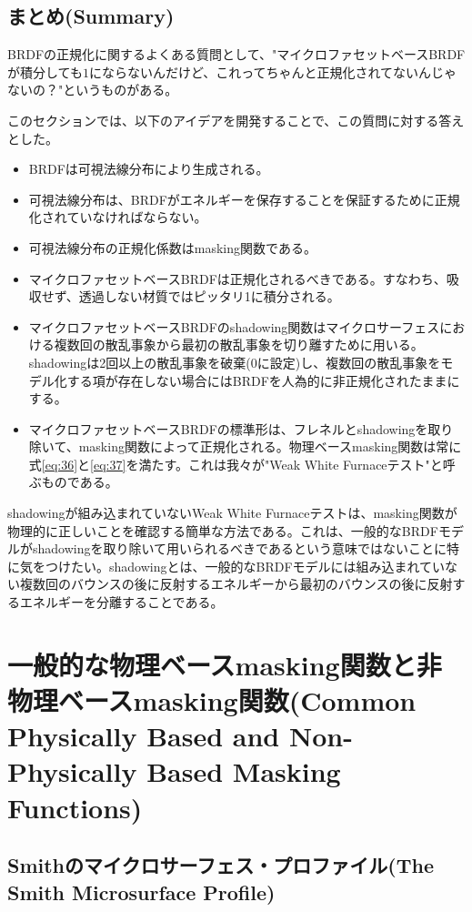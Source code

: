 \documentclass[a4j,xelatex,ja=standard]{bxjsarticle}
\begin{document}
\subsection{まとめ(Summary)}

BRDFの正規化に関するよくある質問として、"マイクロファセットベースBRDFが積分しても$1$にならないんだけど、これってちゃんと正規化されてないんじゃないの？"というものがある。

このセクションでは、以下のアイデアを開発することで、この質問に対する答えとした。

\begin{itemize}
\item BRDFは可視法線分布により生成される。
\item 可視法線分布は、BRDFがエネルギーを保存することを保証するために正規化されていなければならない。
\item 可視法線分布の正規化係数はmasking関数である。
\item マイクロファセットベースBRDFは正規化されるべきである。すなわち、吸収せず、透過しない材質ではピッタリ1に積分される。
\item マイクロファセットベースBRDFのshadowing関数はマイクロサーフェスにおける複数回の散乱事象から最初の散乱事象を切り離すために用いる。shadowingは2回以上の散乱事象を破棄(0に設定)し、複数回の散乱事象をモデル化する項が存在しない場合にはBRDFを人為的に非正規化されたままにする。
\item マイクロファセットベースBRDFの標準形は、フレネルとshadowingを取り除いて、masking関数によって正規化される。物理ベースmasking関数は常に式\eqref{eq:36}と\eqref{eq:37}を満たす。これは我々が"Weak White Furnaceテスト"と呼ぶものである。
\end{itemize}

shadowingが組み込まれていないWeak White Furnaceテストは、masking関数が物理的に正しいことを確認する簡単な方法である。これは、一般的なBRDFモデルがshadowingを取り除いて用いられるべきであるという意味ではないことに特に気をつけたい。shadowingとは、一般的なBRDFモデルには組み込まれていない複数回のバウンスの後に反射するエネルギーから最初のバウンスの後に反射するエネルギーを分離することである。

\section{一般的な物理ベースmasking関数と非物理ベースmasking関数(Common Physically Based and Non-Physically Based Masking Functions)}

\subsection{Smithのマイクロサーフェス・プロファイル(The Smith Microsurface Profile)}
\label{sec:4.1}
\end{document}
